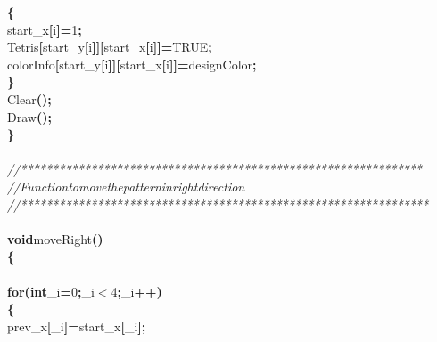 \documentclass[a4paper, 10pt]{article}
\newcommand\SPC{\hspace*{0.6em}}
\newcommand\HYP{\mbox{\char 45}}
\newcommand{\CppAComment}[1]{\textit{\textcolor[rgb]{0.2,0.6,1}{#1}}}
\newcommand{\CppAIdentifier}[1]{#1}
\newcommand{\CppANumber}[1]{\textcolor[rgb]{0.5,0,0.5}{#1}}
\newcommand{\CppAReservedWord}[1]{\textbf{#1}}
\newcommand{\CppASpace}[1]{\colorbox[rgb]{1,1,1}{#1}}
\newcommand{\CppASymbol}[1]{\textbf{\textcolor[rgb]{1,0,0}{#1}}}
\begin{document}
\begin{ttfamily}
\CppASpace{\SPC }\CppASymbol{\{}\\
\CppASpace{\SPC \SPC }\CppAIdentifier{start\_x}\CppASymbol{[}\CppAIdentifier{i}\CppASymbol{]}\CppASymbol{\HYP =}\CppANumber{1}\CppASymbol{;}\\
\CppASpace{\SPC \SPC }\CppAIdentifier{Tetris}\CppASymbol{[}\CppAIdentifier{start\_y}\CppASymbol{[}\CppAIdentifier{i}\CppASymbol{]}\CppASymbol{]}\CppASymbol{[}\CppAIdentifier{start\_x}\CppASymbol{[}\CppAIdentifier{i}\CppASymbol{]}\CppASymbol{]}\CppASymbol{=}\CppAIdentifier{TRUE}\CppASymbol{;}\\
\CppASpace{\SPC \SPC }\CppAIdentifier{colorInfo}\CppASymbol{[}\CppAIdentifier{start\_y}\CppASymbol{[}\CppAIdentifier{i}\CppASymbol{]}\CppASymbol{]}\CppASymbol{[}\CppAIdentifier{start\_x}\CppASymbol{[}\CppAIdentifier{i}\CppASymbol{]}\CppASymbol{]}\CppASymbol{=}\CppAIdentifier{designColor}\CppASymbol{;}\\
\CppASpace{\SPC }\CppASymbol{\}}\\
\CppASpace{\SPC }\CppAIdentifier{Clear}\CppASymbol{(}\CppASymbol{)}\CppASymbol{;}\\
\CppASpace{\SPC }\CppAIdentifier{Draw}\CppASymbol{(}\CppASymbol{)}\CppASymbol{;}\\
\CppASymbol{\}}\\
\\
\CppAComment{//***************************************************************}\\
\CppAComment{//\SPC \SPC \SPC Function\SPC to\SPC move\SPC the\SPC pattern\SPC in\SPC right\SPC direction}\\
\CppAComment{//****************************************************************}\\
\\
\CppAReservedWord{void}\CppASpace{\SPC }\CppAIdentifier{moveRight}\CppASymbol{(}\CppASymbol{)}\\
\CppASymbol{\{}\\
\\
\CppASpace{\SPC }\CppAReservedWord{for}\CppASymbol{(}\CppAReservedWord{int}\CppASpace{\SPC }\CppAIdentifier{\_i}\CppASymbol{=}\CppANumber{0}\CppASymbol{;}\CppAIdentifier{\_i}\CppASymbol{$<$}\CppANumber{4}\CppASymbol{;}\CppAIdentifier{\_i}\CppASymbol{++}\CppASymbol{)}\\
\CppASpace{\SPC }\CppASymbol{\{}\\
\CppASpace{\SPC \SPC }\CppAIdentifier{prev\_x}\CppASymbol{[}\CppAIdentifier{\_i}\CppASymbol{]}\CppASymbol{=}\CppAIdentifier{start\_x}\CppASymbol{[}\CppAIdentifier{\_i}\CppASymbol{]}\CppASymbol{;}\\

\end{ttfamily}
\end{document}
